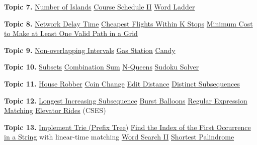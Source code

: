 \documentclass[11pt,letterpaper]{article}
\begin{document}
\textbf{Topic 7.} \href{https://leetcode.com/problems/number-of-islands/}{Number of Islands} \textperiodcentered{} \href{https://leetcode.com/problems/course-schedule-ii/}{Course Schedule II} \textperiodcentered{} \href{https://leetcode.com/problems/word-ladder/}{Word Ladder}

\textbf{Topic 8.} \href{https://leetcode.com/problems/network-delay-time/}{Network Delay Time} \textperiodcentered{} \href{https://leetcode.com/problems/cheapest-flights-within-k-stops/}{Cheapest Flights Within K Stops} \textperiodcentered{} \href{https://leetcode.com/problems/minimum-cost-to-make-at-least-one-valid-path-in-a-grid/}{Minimum Cost to Make at Least One Valid Path in a Grid}

\textbf{Topic 9.} \href{https://leetcode.com/problems/non-overlapping-intervals/}{Non-overlapping Intervals} \textperiodcentered{} \href{https://leetcode.com/problems/gas-station/}{Gas Station} \textperiodcentered{} \href{https://leetcode.com/problems/candy/}{Candy}

\textbf{Topic 10.} \href{https://leetcode.com/problems/subsets/}{Subsets} \textperiodcentered{} \href{https://leetcode.com/problems/combination-sum/}{Combination Sum} \textperiodcentered{} \href{https://leetcode.com/problems/n-queens/}{N-Queens} \textperiodcentered{} \href{https://leetcode.com/problems/sudoku-solver/}{Sudoku Solver}

\textbf{Topic 11.} \href{https://leetcode.com/problems/house-robber/}{House Robber} \textperiodcentered{} \href{https://leetcode.com/problems/coin-change/}{Coin Change} \textperiodcentered{} \href{https://leetcode.com/problems/edit-distance/}{Edit Distance} \textperiodcentered{} \href{https://leetcode.com/problems/distinct-subsequences/}{Distinct Subsequences}

\textbf{Topic 12.} \href{https://leetcode.com/problems/longest-increasing-subsequence/}{Longest Increasing Subsequence} \textperiodcentered{} \href{https://leetcode.com/problems/burst-balloons/}{Burst Balloons} \textperiodcentered{} \href{https://leetcode.com/problems/regular-expression-matching/}{Regular Expression Matching} \textperiodcentered{} \href{https://cses.fi/problemset/task/1653}{Elevator Rides} (CSES)

\textbf{Topic 13.} \href{https://leetcode.com/problems/implement-trie-prefix-tree/}{Implement Trie (Prefix Tree)} \textperiodcentered{} \href{https://leetcode.com/problems/find-the-index-of-the-first-occurrence-in-a-string/}{Find the Index of the First Occurrence in a String} with linear-time matching \textperiodcentered{} \href{https://leetcode.com/problems/word-search-ii/}{Word Search II} \textperiodcentered{} \href{https://leetcode.com/problems/shortest-palindrome/}{Shortest Palindrome}
\end{document}
